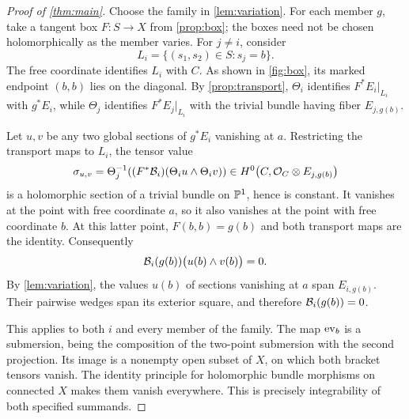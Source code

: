 \begin{proof}[Proof of \cref{thm:main}]
Choose the family in \cref{lem:variation}. For each member \(g\), take a
tangent box \(F:S\to X\) from \cref{prop:box}; the boxes need not be
chosen holomorphically as the member varies. For \(j\ne i\), consider
\[
L_i=\{(s_1,s_2)\in S:s_j=b\}.
\]
The free coordinate identifies \(L_i\) with \(C\). As shown in
\cref{fig:box}, its marked endpoint \((b,b)\) lies on the diagonal.
By \cref{prop:transport}, \(\Theta_i\) identifies
\(F^*E_i|_{L_i}\) with \(g^*E_i\), while \(\Theta_j\) identifies
\(F^*E_j|_{L_i}\) with the trivial bundle having fiber \(E_{j,g(b)}\).

Let \(u,v\) be any two global sections of \(g^*E_i\) vanishing at
\(a\). Restricting the transport maps to \(L_i\), the tensor value
\[
\sigma_{u,v}
=\Theta_j^{-1}\!\left((F^*\mathcal B_i)(\Theta_i u\wedge\Theta_i v)\right)
\in H^0\bigl(C,\mathcal O_C\otimes E_{j,g(b)}\bigr)
\]
is a holomorphic section of a trivial bundle on \(\mathbb P^1\), hence is
constant. It vanishes at the point with free coordinate \(a\), so it
also vanishes at the point with free coordinate \(b\). At this latter
point, \(F(b,b)=g(b)\) and both transport maps are the identity.
Consequently
\[
\mathcal B_i(g(b))\bigl(u(b)\wedge v(b)\bigr)=0.
\]
By \cref{lem:variation}, the values \(u(b)\) of sections vanishing at
\(a\) span \(E_{i,g(b)}\). Their pairwise wedges span its exterior
square, and therefore \(\mathcal B_i(g(b))=0\).

This applies to both \(i\) and every member of the family. The map
\(\operatorname{ev}_b\) is a submersion, being the composition of the two-point
submersion with the second projection. Its image is a nonempty open
subset of \(X\), on which both bracket tensors vanish. The identity
principle for holomorphic bundle morphisms on connected \(X\) makes
them vanish everywhere. This is precisely integrability of both
specified summands.
\end{proof}


